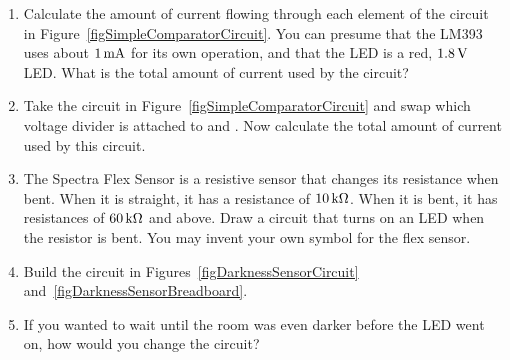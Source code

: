 
\begin{enumerate}
\item  Calculate the amount of current flowing through each element of the circuit in Figure~\ref{figSimpleComparatorCircuit}.  You can presume that the LM393 uses about $1\,\si{\milli\ampere}$ for its own operation, and that the LED is a red, $1.8\,\si{\volt}$ LED.  What is the total amount of current used by the circuit?
\item Take the circuit in Figure~\ref{figSimpleComparatorCircuit} and swap which voltage divider is attached to  and .  Now calculate the total amount of current used by this circuit.
\item The Spectra Flex Sensor is a resistive sensor that changes its resistance when bent.  When it is straight, it has a resistance of $10\,\si{\kilo\ohm}$.  When it is bent, it has resistances of $60\,\si{\kilo\ohm}$ and above.  Draw a circuit that turns on an LED when the resistor is bent.  You may invent your own symbol for the flex sensor.
\item Build the circuit in Figures~\ref{figDarknessSensorCircuit} and~\ref{figDarknessSensorBreadboard}. 
\item If you wanted to wait until the room was even darker before the LED went on, how would you change the circuit?
\end{enumerate}

